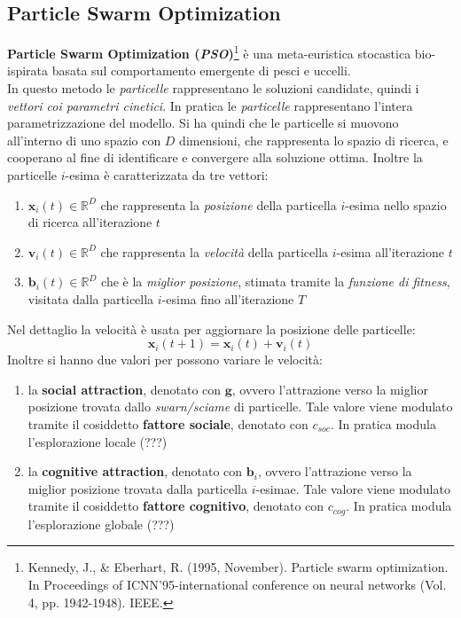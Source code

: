 \documentclass[a4paper,12pt, oneside]{book}
\begin{document}
\subsection{Particle Swarm Optimization}
\textbf{Particle Swarm Optimization (\textit{PSO})}\footnote{Kennedy, J., \&
  Eberhart, R. (1995, November). Particle swarm optimization. In Proceedings of
  ICNN'95-international conference on neural networks (Vol. 4,
  pp. 1942-1948). IEEE.} è una meta-euristica 
stocastica bio-ispirata basata sul comportamento emergente di pesci e uccelli.\\
In questo metodo le \textit{particelle} rappresentano le soluzioni candidate,
quindi i \textit{vettori coi parametri cinetici}. In pratica le
\textit{particelle} rappresentano l'intera parametrizzazione del modello. Si ha
quindi che le particelle si muovono all'interno di uno spazio con $D$
dimensioni, che rappresenta lo spazio di ricerca, e cooperano al fine di
identificare e convergere alla soluzione ottima. Inoltre la particelle $i$-esima
è caratterizzata da tre vettori:
\begin{enumerate}
  \item $\mathbf{x}_i(t)\in\mathbb{R}^D$ che rappresenta la \textit{posizione}
  della particella  
  $i$-esima nello spazio di ricerca all'iterazione $t$
  \item $\mathbf{v}_i(t)\in\mathbb{R}^D$ che rappresenta la \textit{velocità}
  della particella $i$-esima all'iterazione $t$
  \item $\mathbf{b}_i(t)\in\mathbb{R}^D$ che è la \textit{miglior posizione},
  stimata tramite la \textit{funzione di fitness}, visitata dalla particella
  $i$-esima fino all'iterazione $T$
\end{enumerate}
Nel dettaglio la velocità è usata per aggiornare la posizione delle particelle:
\[\mathbf{x}_i(t+1)=\mathbf{x}_i(t)+\mathbf{v}_i(t)\]
Inoltre si hanno due valori per possono variare le velocità:
\begin{enumerate}
  \item la \textbf{social attraction}, denotato con $\mathbf{g}$, ovvero
  l'attrazione verso la miglior 
  posizione trovata dallo \textit{swarn/sciame} di particelle. Tale valore viene
  modulato tramite il cosiddetto \textbf{fattore sociale}, denotato con
  $c_{soc}$. In pratica modula l'esplorazione locale (???)
  \item la \textbf{cognitive attraction}, denotato con $\mathbf{b}_i$, ovvero
  l'attrazione verso la miglior posizione trovata dalla particella
  $i$-esimae. Tale valore viene 
  modulato tramite il cosiddetto \textbf{fattore cognitivo}, denotato con
  $c_{cog}$. In pratica modula l'esplorazione globale (???)
\end{enumerate}
\end{document}
